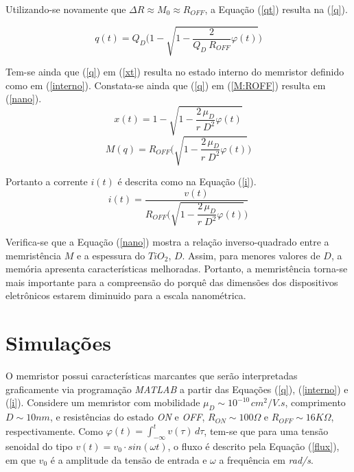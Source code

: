 \documentclass{ceel}
\begin{document}
\begin{multicols}{2}
Utilizando-se novamente que $\Delta R \approx M_0 \approx R_{OFF}$, a Equação (\ref{qt}) resulta na (\ref{q}). 
\vspace{0.05cm}

\begin{equation}\label{q}
q(t)=Q_D\Bigg(1-\sqrt{1-\dfrac{2}{Q_D\ R_{OFF}}\varphi(t)}\Bigg)
\end{equation} 
\vspace{0.05cm}

Tem-se ainda que (\ref{q}) em (\ref{xt}) resulta no estado interno do memristor definido como em (\ref{interno}). Constata-se ainda que (\ref{q}) em (\ref{M:ROFF}) resulta em (\ref{nano}).
\begin{equation}\label{interno}
x(t)=1-\sqrt{1-\dfrac{2\, \mu_D}{r\; D^2}\varphi(t)}
\end{equation} 
\begin{equation}\label{nano}
M(q)=R_{OFF}\Bigg(\sqrt{1-\dfrac{2\, \mu_D}{r\; D^2}\varphi(t) }\Bigg)
\end{equation}
\vspace{0.05cm}

Portanto a corrente $i(t)$ é descrita como na Equação (\ref{i}).
\begin{equation}\label{i}
i(t)=\dfrac{v(t)}{R_{OFF}\Bigg(\sqrt{1-\dfrac{2\, \mu_D}{r\; D^2}\varphi(t) }\Bigg)}
\end{equation} 

Verifica-se que a Equação (\ref{nano}) mostra a relação inverso-quadrado entre a memristência $M$ e a espessura do $TiO_2$, $D$. Assim, para menores valores de $D$, a memória apresenta características melhoradas. Portanto, a memristência torna-se mais importante para a compreensão do porquê das dimensões dos dispositivos eletrônicos estarem diminuido para a escala nanométrica.

\section{Simulações} \label{sim}
O memristor possui características marcantes que serão interpretadas graficamente via programação \emph{MATLAB} a partir das Equações (\ref{q}), (\ref{interno}) e (\ref{i}). Considere um memristor com mobilidade $\mu_D \sim 10^{-10\,} cm^2/V.s$, comprimento $D\sim10nm$, e resistências do estado \textit{ON} e \textit{OFF}, $R_{ON}\sim 100\Omega$ e $R_{OFF}\sim 16K\Omega$, respectivamente. Como $\varphi(t)=\int_{-\infty}^t v(\tau)\, d\tau$, tem-se que para uma tensão senoidal do tipo $v(t)=v_0\cdot sin(\omega t)$, o fluxo é descrito pela Equação (\ref{flux}), em que $v_0$ é a amplitude da tensão de entrada e $\omega$ a frequência em \textit{rad/s}.


\end{multicols}
\end{document}
